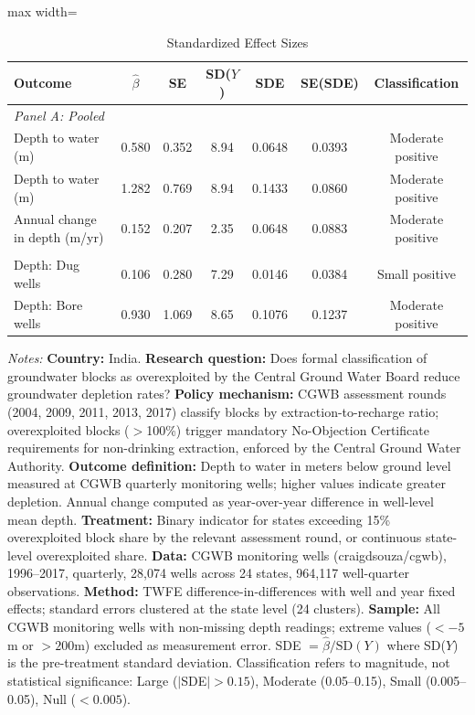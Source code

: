 \begin{table}[htbp]
\centering
\caption{Standardized Effect Sizes}
\label{tab:sde}
\begin{adjustbox}{max width=\textwidth}
\begin{threeparttable}
\begin{tabular}{lcccccc}
\toprule
Outcome & $\hat{\beta}$ & SE & SD($Y$) & SDE & SE(SDE) & Classification \\
\midrule
\multicolumn{7}{l}{\textit{Panel A: Pooled}} \\
\quad Depth to water (m) & 0.580 & 0.352 & 8.94 & 0.0648 & 0.0393 & Moderate positive \\
\quad Depth to water (m) & 1.282 & 0.769 & 8.94 & 0.1433 & 0.0860 & Moderate positive \\
\quad Annual change in depth (m/yr) & 0.152 & 0.207 & 2.35 & 0.0648 & 0.0883 & Moderate positive \\
\addlinespace
\multicolumn{7}{l}{\textit{Panel B: By well type}} \\
\quad Depth: Dug wells & 0.106 & 0.280 & 7.29 & 0.0146 & 0.0384 & Small positive \\
\quad Depth: Bore wells & 0.930 & 1.069 & 8.65 & 0.1076 & 0.1237 & Moderate positive \\
\bottomrule
\end{tabular}
\begin{tablenotes}[flushleft]
\footnotesize
\item \textit{Notes:}
\textbf{Country:} India.
\textbf{Research question:} Does formal classification of groundwater blocks as
overexploited by the Central Ground Water Board reduce groundwater depletion rates?
\textbf{Policy mechanism:} CGWB assessment rounds (2004, 2009, 2011, 2013, 2017)
classify blocks by extraction-to-recharge ratio; overexploited blocks ($>$100\%)
trigger mandatory No-Objection Certificate requirements for non-drinking extraction,
enforced by the Central Ground Water Authority.
\textbf{Outcome definition:} Depth to water in meters below ground level measured
at CGWB quarterly monitoring wells; higher values indicate greater depletion.
Annual change computed as year-over-year difference in well-level mean depth.
\textbf{Treatment:} Binary indicator for states exceeding 15\% overexploited block
share by the relevant assessment round, or continuous state-level overexploited share.
\textbf{Data:} CGWB monitoring wells (craigdsouza/cgwb), 1996--2017, quarterly,
28,074 wells across 24 states, 964,117 well-quarter observations.
\textbf{Method:} TWFE difference-in-differences with well and year fixed effects;
standard errors clustered at the state level (24 clusters).
\textbf{Sample:} All CGWB monitoring wells with non-missing depth readings;
extreme values ($<-5$m or $>200$m) excluded as measurement error.
SDE $= \hat{\beta} / \text{SD}(Y)$ where SD($Y$) is the pre-treatment
standard deviation. Classification refers to magnitude, not statistical significance:
Large ($|$SDE$| > 0.15$), Moderate (0.05--0.15), Small (0.005--0.05), Null ($< 0.005$).
\end{tablenotes}
\end{threeparttable}
\end{adjustbox}
\end{table}
